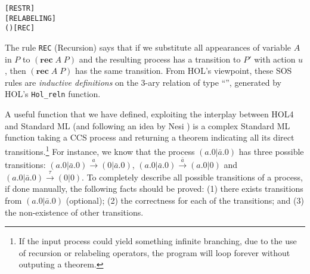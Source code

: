 \begin{alltt}
   \HOLSymConst{\ensuremath{\nu}}   \HOLTokenTransBegin{}\HOLTokenTransEnd \HOLSymConst{\ensuremath{\nu}}  \hfill\texttt{[RESTR]}
\HOLTokenTurnstile{}  \HOLTokenTransBegin{}\HOLTokenTransEnd {} \HOLSymConst{\HOLTokenImp{}}    \HOLTokenTransBegin{}  \HOLTokenTransEnd {}  \hfill\texttt{[RELABELING]}
\HOLTokenTurnstile{}   (  )  \HOLTokenTransBegin{}\HOLTokenTransEnd {} \HOLSymConst{\HOLTokenImp{}}    \HOLTokenTransBegin{}\HOLTokenTransEnd {}\hfill\texttt{[REC]}
\end{alltt}

The rule \texttt{REC} (Recursion)
 says that if we substitute all appearances of variable $A$ in $P$ to
$(\mathbf{rec}\; A\; P)$ and the resulting process has a transition to $P'$
with action $u$, then $(\mathbf{rec}\; A\; P)$ has the same
transition. From HOL's viewpoint, these
SOS rules are \emph{inductive 
  definitions} on the 3-ary relation  of type ``'', generated by HOL's 
\texttt{Hol_reln} function.

A useful function that we have defined, exploiting the interplay
between HOL4 and Standard ML (and following an idea by Nesi \cite{Nesi:1992ve})
 is a complex Standard ML function
  taking a CCS process and returning a theorem indicating all its
  direct transitions.\footnote{If the input process could yield
    something infinite branching, due to the use of recursion or
    relabeling operators, the program will loop forever without
    outputing a theorem.}
For instance, we know that the process $(a.0 | \bar{a}.0)$ has three
possible transitions: $(a.0 | \bar{a}.0) \overset{a}{\longrightarrow}
(0 | \bar{a}.0)$, $(a.0 | \bar{a}.0)
\overset{\bar{a}}{\longrightarrow} (a.0 | 0)$ and $(a.0 | \bar{a}.0)
\overset{\tau}{\longrightarrow} (0 | 0)$.
To completely describe all possible transitions of a process, if done manually, the
following facts should be proved: (1) there exists transitions from
$(a.0 | \bar{a}.0)$ (optional); (2) the correctness for each of the
transitions; and (3) the non-existence of other transitions.

